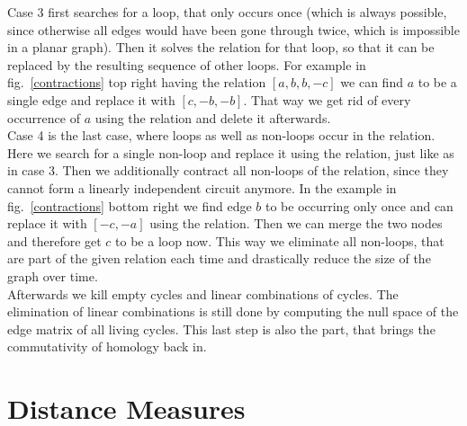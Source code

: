 \documentclass[11pt, a4paper, UKenglish]{article}
\begin{document}
    Case 3 first searches for a loop, that only occurs once (which is always possible, since otherwise all edges would have been gone through twice, which is impossible in a planar graph).
    Then it solves the relation for that loop, so that it can be replaced by the resulting sequence of other loops.
    For example in fig.\ \ref{contractions} top right having the relation $[a, b, b, -c]$ we can find $a$ to be a single edge and replace it with $[c, -b, -b]$.
    That way we get rid of every occurrence of $a$ using the relation and delete it afterwards.\\
    Case 4 is the last case, where loops as well as non-loops occur in the relation.
    Here we search for a single non-loop and replace it using the relation, just like as in case 3.
    Then we additionally contract all non-loops of the relation, since they cannot form a linearly independent circuit anymore.
    In the example in fig.\ \ref{contractions} bottom right we find edge $b$ to be occurring only once and can replace it with $[-c, -a]$ using the relation.
    Then we can merge the two nodes and therefore get $c$ to be a loop now.
    This way we eliminate all non-loops, that are part of the given relation each time and drastically reduce the size of the graph over time.\\
    Afterwards we kill empty cycles and linear combinations of cycles.
    The elimination of linear combinations is still done by computing the null space of the edge matrix of all living cycles.
    This last step is also the part, that brings the commutativity of homology back in.
    

    \section{Distance Measures}\label{sec:distance-measures}
\end{document}
